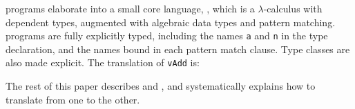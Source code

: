\noindent
\Idris{} programs elaborate into a small core language, \TT{}, which is a $\lambda$-calculus
with dependent types, augmented with algebraic data types and pattern matching.
\TT{} programs are fully explicitly typed, including the names \texttt{a} and \texttt{n}
in the type declaration, and the names bound in each pattern match clause.
Type classes are also made explicit.
The \TT{} translation of \texttt{vAdd} is:


\noindent
The rest of this paper describes \Idris{} and \TT{}, and systematically explains
how to translate from one to the other.


